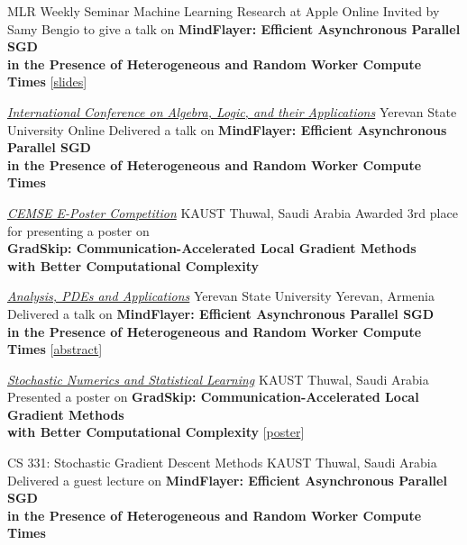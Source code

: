 \documentclass[10pt,a4paper,sans]{moderncv}        %
\newcommand{\red}{\color{cherry}}
\newcommand{\kaust}{KAUST}
\newcommand{\yerevan}{Yerevan, Armenia}
\newcommand{\thuwal}{Thuwal, Saudi Arabia}
\newcommand{\ysu}{Yerevan State University}
\newcommand{\highlight}[1]{{\red #1}}
\begin{document}
    {MLR Weekly Seminar}
    {Machine Learning Research at Apple}
    {Online}
    {}
    {
      Invited by \highlight{Samy Bengio} to give a talk on \textbf{MindFlayer: Efficient Asynchronous Parallel SGD \\ in the Presence of Heterogeneous and Random Worker Compute Times} [{\href{https://artomaranjyan.github.io/assets/pdf/MindFlayer_AppleMLR.pdf}{slides}}]
    }

  {\textcolor{accent}{\href{https://sites.google.com/view/wala24/home?authuser=0}{\textit{International Conference on Algebra, Logic, and their Applications}}}}
  {\ysu}
  {Online}{}
  {
    Delivered a talk on \textbf{MindFlayer: Efficient Asynchronous Parallel SGD \\ in the Presence of Heterogeneous and Random Worker Compute Times}
  }

  {\textcolor{accent}{\href{https://cemse.kaust.edu.sa/events/event/e-poster-competition}{\textit{CEMSE E-Poster Competition}}}}
  {\kaust}
  {\thuwal}
  {}
  {
    Awarded 3rd place for presenting a poster on \\ \textbf{GradSkip: Communication-Accelerated Local Gradient Methods \\ with Better Computational Complexity}
  }

  {\textcolor{accent}{\href{https://gmg70.com/}{\textit{Analysis, PDEs and Applications}}}}
  {\ysu}
  {\yerevan}
  {}
  {
    Delivered a talk on \textbf{MindFlayer: Efficient Asynchronous Parallel SGD \\ in the Presence of Heterogeneous and Random Worker Compute Times} [{\href{https://gmg70.com/downloads/ConferenceAbstracts.pdf\#page=19}{abstract}}]
  }

  {\textcolor{accent}{\href{https://cemse.kaust.edu.sa/events/by-type/workshop/2024/05/19/stochastic-numerics-and-statistical-learning-theory-and}{\textit{Stochastic Numerics and Statistical Learning}}}}
  {\kaust}
  {\thuwal}
  {}
  {
    Presented a poster on \textbf{GradSkip: Communication-Accelerated Local Gradient Methods \\ with Better Computational Complexity} [{\href{https://artomaranjyan.github.io/assets/pdf/GradSkip_Rising_Stars.pdf}{poster}}]
  }

  {CS 331: Stochastic Gradient Descent Methods}
  {\kaust}
  {\thuwal}
  {}
  {
    Delivered a guest lecture on \textbf{MindFlayer: Efficient Asynchronous Parallel SGD \\ in the Presence of Heterogeneous and Random Worker Compute Times}
  }
\end{document}
